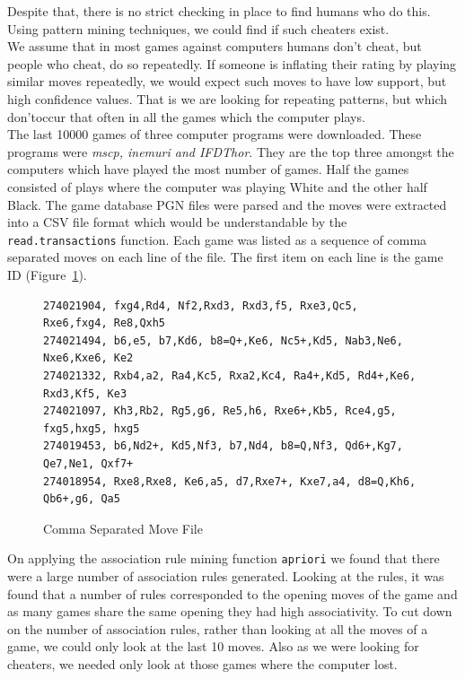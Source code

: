 \documentclass{article}
\begin{document}
Despite that, there is no strict checking in place to find humans who do this. Using pattern mining techniques, we could find if such cheaters exist.\\

We assume that in most games against computers humans don't cheat, but people who cheat, do so repeatedly. If someone is inflating their rating by playing similar moves repeatedly, we would expect such moves to have low support, but  high confidence values. That is we are looking for repeating patterns, but which don'toccur that often in all the games which the computer plays.\\

The last 10000 games of three computer programs were downloaded. These programs were {\sl mscp, inemuri and IFDThor}. They are the top three amongst the computers which have played the most number of games. Half the games consisted of plays where the computer was playing White and the other half Black. The game database PGN files were parsed and the moves were extracted into a CSV file format which would be understandable by the \verb=read.transactions= function. Each game was listed as a sequence of comma separated moves on each line of the file. The first item on each line is the game ID (Figure~\ref{fig:movecsv}).\\

\begin{figure}[htp]

\begin{verbatim}
274021904, fxg4,Rd4, Nf2,Rxd3, Rxd3,f5, Rxe3,Qc5, Rxe6,fxg4, Re8,Qxh5
274021494, b6,e5, b7,Kd6, b8=Q+,Ke6, Nc5+,Kd5, Nab3,Ne6, Nxe6,Kxe6, Ke2
274021332, Rxb4,a2, Ra4,Kc5, Rxa2,Kc4, Ra4+,Kd5, Rd4+,Ke6, Rxd3,Kf5, Ke3
274021097, Kh3,Rb2, Rg5,g6, Re5,h6, Rxe6+,Kb5, Rce4,g5, fxg5,hxg5, hxg5
274019453, b6,Nd2+, Kd5,Nf3, b7,Nd4, b8=Q,Nf3, Qd6+,Kg7, Qe7,Ne1, Qxf7+
274018954, Rxe8,Rxe8, Ke6,a5, d7,Rxe7+, Kxe7,a4, d8=Q,Kh6, Qb6+,g6, Qa5
\end{verbatim}
\caption{Comma Separated Move File}
\label{fig:movecsv}
\end{figure}


On applying the association rule mining function \verb=apriori= we found that there were a large number of association rules generated. Looking at the rules, it was found that a number of rules corresponded to the opening moves of the game and as many games share the same opening they had high associativity. To cut down on the number of association rules, rather than looking at all the moves of a game, we could only look at the last 10 moves. Also as we were looking for cheaters, we needed only look at those games where the computer lost.\\
\end{document}
